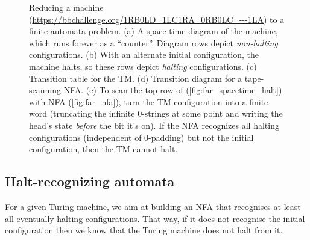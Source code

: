 \begin{figure}
  \caption{Reducing a machine (\url{https://bbchallenge.org/1RB0LD_1LC1RA_0RB0LC_---1LA}) to a finite automata problem.
    (a) A space-time diagram of the machine, which runs forever as a ``counter''. Diagram rows depict \emph{non-halting} configurations.
    (b) With an alternate initial configuration, the machine halts, so these rows depict \emph{halting} configurations.
    (c) Transition table for the TM.
    (d) Transition diagram for a tape-scanning NFA.
    (e) To scan the top row of (\ref{fig:far_spacetime_halt}) with NFA (\ref{fig:far_nfa}), turn the TM configuration into a finite word
    (truncating the infinite 0-strings at some point and writing the head's state \emph{before} the bit it's on).
    If the NFA recognizes all halting configurations (independent of 0-padding) but not the initial configuration, then the TM cannot halt.}
  \label{fig:finite-automata-reduction}
\end{figure}


\subsection{Halt-recognizing automata}
\newcommand{\M}{\mathcal{M}}
\newcommand{\T}{^T}
\newcommand{\row}{\text{row}}
\label{far-defs-recognizer}
For a given Turing machine, we aim at building an NFA that recognises at least all eventually-halting configurations. That way, if it does not recognise the initial configuration then we know that the Turing machine does not halt from it.


